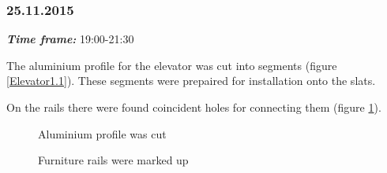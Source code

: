 \subsubsection{25.11.2015}
\textit{\textbf{Time frame:}} 19:00-21:30 

The aluminium profile for the elevator was cut into segments (figure \ref{Elevator1.1}). These segments were prepaired for installation onto the slats.

On the rails there were found coincident holes for connecting them (figure \ref{Elevator1.2}).

\begin{figure}[H]
	\begin{minipage}[h]{0.47\linewidth}
		\caption{Aluminium profile was cut}
		\label{Elevator1.1}
	\end{minipage}
	\hfill
	\begin{minipage}[h]{0.47\linewidth}
		\caption{Furniture rails were marked up}
		\label{Elevator1.2}
	\end{minipage}
\end{figure}

